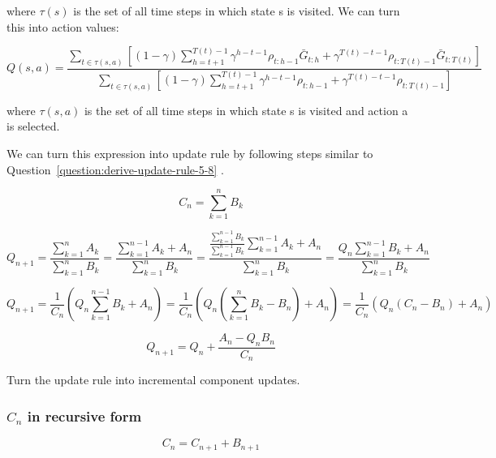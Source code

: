 \documentclass[11pt]{article}
\begin{document}
    where $\tau(s)$ is the set of all time steps in which state s is visited.
    We can turn this into action values:

    \begin{equation}
        Q(s,a) =  \frac{ \sum_{t \in \tau(s, a) } [ (1-\gamma) \sum_{h=t+1}^{T(t)-1} \gamma^{h-t-1} \rho_{t:h-1} \bar{G}_{t:h} + \gamma^{T(t)-t-1} \rho_{t:T(t)-1} \bar{G}_{t:T(t)} ]   }{ \sum_{t \in \tau(s,a) } [ (1-\gamma) \sum_{h=t+1}^{T(t)-1} \gamma^{h-t-1} \rho_{t:h-1} + \gamma^{T(t)-t-1} \rho_{t:T(t)-1} ]  }
    \end{equation}

    where $\tau(s,a)$ is the set of all time steps in which state s is visited and action a is selected.

    We can turn this expression into update rule by following steps similar to Question~\ref{question:derive-update-rule-5-8} .

    \begin{equation}
        C_{n} = \sum_{k=1}^{n} B_{k}
    \end{equation}

    \begin{equation}
        Q_{n+1} = \frac{ \sum_{k=1}^{n} A_{k}}{ \sum_{k=1}^{n} B_{k} } = \frac{ \sum_{k=1}^{n-1} A_{k} + A_{n}}{ \sum_{k=1}^{n} B_{k} } = \frac{ \frac{\sum_{k=1}^{n-1} B_{k} }{\sum_{k=1}^{n-1} B_{k} } \sum_{k=1}^{n-1} A_{k} + A_{n}}{ \sum_{k=1}^{n} B_{k} }  = \frac{ Q_{n} \sum_{k=1}^{n-1} B_{k} + A_{n}}{ \sum_{k=1}^{n} B_{k} }
    \end{equation}

    \begin{equation}
        Q_{n+1}  = \frac{1}{C_{n}} (  Q_{n} \sum_{k=1}^{n-1} B_{k} + A_{n} ) = \frac{1}{C_{n}} ( Q_{n} ( \sum_{k=1}^{n} B_{k} - B_{n} ) + A_{n} ) = \frac{1}{C_{n}} ( Q_{n} ( C_{n} - B_{n} ) + A_{n} )
    \end{equation}

    \begin{equation}
        Q_{n+1} = Q_{n} + \frac{A_{n} -  Q_{n} B_{n} }{C_{n}}
    \end{equation}

    Turn the update rule into incremental component updates.

    \subsubsection*{$C_n$ in recursive form}

    \begin{equation}
        C_{n} = C_{n+1} + B_{n+1}
    \end{equation}
\end{document}
